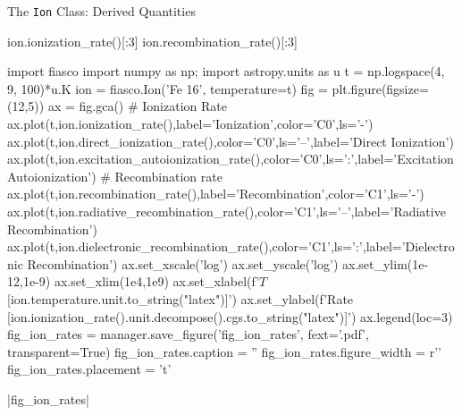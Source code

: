 \documentclass[12pt,aspectratio=169]{beamer}
\begin{document}
\begin{frame}[fragile]{The \texttt{Ion} Class: Derived Quantities}
    \scriptsize
    \begin{pyconsole}
ion.ionization_rate()[:3]
ion.recombination_rate()[:3]
    \end{pyconsole}
    \begin{pycode}[manager]
import fiasco
import numpy as np; import astropy.units as u
t = np.logspace(4, 9, 100)*u.K
ion = fiasco.Ion('Fe 16', temperature=t)
fig = plt.figure(figsize=(12,5))
ax = fig.gca()
# Ionization Rate
ax.plot(t,ion.ionization_rate(),label='Ionization',color='C0',ls='-')
ax.plot(t,ion.direct_ionization_rate(),color='C0',ls='--',label='Direct Ionization')
ax.plot(t,ion.excitation_autoionization_rate(),color='C0',ls=':',label='Excitation Autoionization')
# Recombination rate
ax.plot(t,ion.recombination_rate(),label='Recombination',color='C1',ls='-')
ax.plot(t,ion.radiative_recombination_rate(),color='C1',ls='--',label='Radiative Recombination')
ax.plot(t,ion.dielectronic_recombination_rate(),color='C1',ls=':',label='Dielectronic Recombination')
ax.set_xscale('log')
ax.set_yscale('log')
ax.set_ylim(1e-12,1e-9)
ax.set_xlim(1e4,1e9)
ax.set_xlabel(f'$T$ [{ion.temperature.unit.to_string("latex")}]')
ax.set_ylabel(f'Rate [{ion.ionization_rate().unit.decompose().cgs.to_string("latex")}]')
ax.legend(loc=3)
fig_ion_rates = manager.save_figure('fig_ion_rates', fext='.pdf', transparent=True)
fig_ion_rates.caption = ''
fig_ion_rates.figure_width = r'\textwidth'
fig_ion_rates.placement = 't'
    \end{pycode}
    \vspace{-5ex}
    \py[manager]|fig_ion_rates|
\end{frame}
\end{document}
